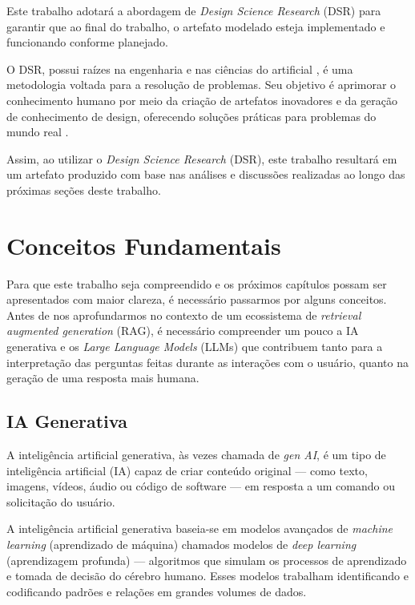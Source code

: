 \documentclass[a4paper, 12pt]{article}
\newcommand{\citeb}[1]{\bibleftbracket\cite{#1}\bibrightbracket}
\begin{document}
    Este trabalho adotará a abordagem de \textit{Design Science Research} (DSR) para garantir que ao final do trabalho, o artefato modelado esteja implementado e funcionando conforme planejado.

    O DSR, possui raízes na engenharia e nas ciências do artificial \citeb{simon_1996}, é uma metodologia voltada para a resolução de problemas. Seu objetivo é aprimorar o conhecimento humano por meio da criação de artefatos inovadores e da geração de conhecimento de design, oferecendo soluções práticas para problemas do mundo real \citeb{design_science}.

    Assim, ao utilizar o \textit{Design Science Research} (DSR), este trabalho resultará em um artefato produzido com base nas análises e discussões realizadas ao longo das próximas seções deste trabalho.
    
    \clearpage

    \section{Conceitos Fundamentais} \label{sec:concepts}

    Para que este trabalho seja compreendido e os próximos capítulos possam ser apresentados com maior clareza, é necessário passarmos por alguns conceitos. Antes de nos aprofundarmos no contexto de um ecossistema de \textit{retrieval augmented generation} (RAG), é necessário compreender um pouco a IA generativa e os \textit{Large Language Models} (LLMs) que contribuem tanto para a interpretação das perguntas feitas durante as interações com o usuário, quanto na geração de uma resposta mais humana.
    
    \subsection{IA Generativa}
    
    A inteligência artificial generativa, às vezes chamada de \textit{gen AI}, é um tipo de inteligência artificial (IA) capaz de criar conteúdo original — como texto, imagens, vídeos, áudio ou código de software — em resposta a um comando ou solicitação do usuário. \citeb{genai_ibm}

    A inteligência artificial generativa baseia-se em modelos avançados de \textit{machine learning} (aprendizado de máquina) chamados modelos de \textit{deep learning} (aprendizagem profunda) — algoritmos que simulam os processos de aprendizado e tomada de decisão do cérebro humano. Esses modelos trabalham identificando e codificando padrões e relações em grandes volumes de dados.
\end{document}
